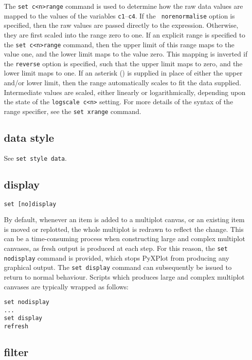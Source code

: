 The {\tt set c<n>range} command is used to determine how the raw data values
are mapped to the values of the variables {\tt c1}--{\tt c4}. If the {\tt
no\-renor\-malise} option is specified, then the raw values are passed directly
to the expression. Otherwise, they are first scaled into the range zero to one.
If an explicit range is specified to the {\tt set c<n>range} command, then the
upper limit of this range maps to the value one, and the lower limit maps to
the value zero. This mapping is inverted if the {\tt reverse} option is
specified, such that the upper limit maps to zero, and the lower limit maps to
one. If an asterisk ({\tt *}) is supplied in place of either the upper and/or
lower limit, then the range automatically scales to fit the data supplied.
Intermediate values are scaled, either linearly or logarithmically, depending
upon the state of the {\tt logscale c<n>} setting. For more details of the
syntax of the range specifier, see the {\tt set xrange} command.


\subsection{data style}

See {\tt set style data}.


\subsection{display}

\begin{verbatim}
set [no]display
\end{verbatim}

By default, whenever an item is added to a multiplot canvas, or an existing
item is moved or replotted, the whole multiplot is redrawn to reflect the
change.  This can be a time-consuming process when constructing large and
complex multiplot canvases, as fresh output is produced at each step. For this
reason, the {\tt set nodisplay} command is provided, which stops PyXPlot from
producing any graphical output. The {\tt set display} command can subsequently
be issued to return to normal behaviour. Scripts which produces large and
complex multiplot canvases are typically wrapped as follows:

\begin{verbatim}
set nodisplay
...
set display
refresh
\end{verbatim}


\subsection{filter}

